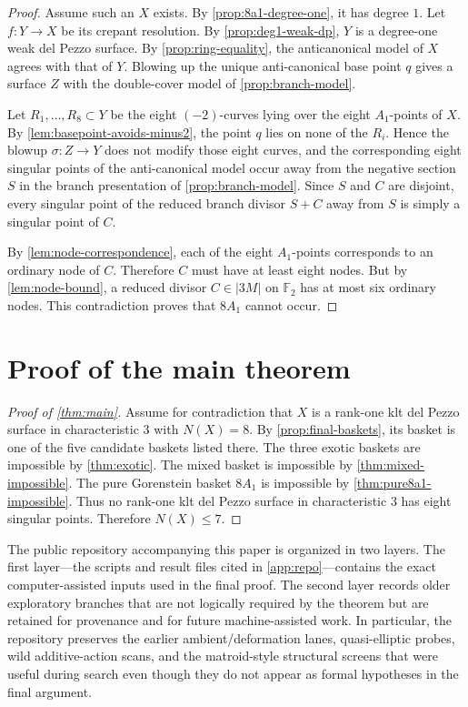 \documentclass[11pt]{article}
\theoremstyle{definition}
\begin{document}
\begin{proof}
Assume such an $X$ exists. By \cref{prop:8a1-degree-one}, it has degree $1$. Let $f\colon Y\to X$ be its crepant resolution. By \cref{prop:deg1-weak-dp}, $Y$ is a degree-one weak del Pezzo surface. By \cref{prop:ring-equality}, the anticanonical model of $X$ agrees with that of $Y$. Blowing up the unique anti-canonical base point $q$ gives a surface $Z$ with the double-cover model of \cref{prop:branch-model}.

Let $R_1,\dots,R_8\subset Y$ be the eight $(-2)$-curves lying over the eight $A_1$-points of $X$. By \cref{lem:basepoint-avoids-minus2}, the point $q$ lies on none of the $R_i$. Hence the blowup $\sigma\colon Z\to Y$ does not modify those eight curves, and the corresponding eight singular points of the anti-canonical model occur away from the negative section $S$ in the branch presentation of \cref{prop:branch-model}. Since $S$ and $C$ are disjoint, every singular point of the reduced branch divisor $S+C$ away from $S$ is simply a singular point of $C$.

By \cref{lem:node-correspondence}, each of the eight $A_1$-points corresponds to an ordinary node of $C$. Therefore $C$ must have at least eight nodes. But by \cref{lem:node-bound}, a reduced divisor $C\in |3M|$ on $\mathbb F_2$ has at most six ordinary nodes. This contradiction proves that $8A_1$ cannot occur.
\end{proof}

\section{Proof of the main theorem}

\begin{proof}[Proof of \cref{thm:main}]
Assume for contradiction that $X$ is a rank-one klt del Pezzo surface in characteristic $3$ with $N(X)=8$. By \cref{prop:final-baskets}, its basket is one of the five candidate baskets listed there. The three exotic baskets are impossible by \cref{thm:exotic}. The mixed basket is impossible by \cref{thm:mixed-impossible}. The pure Gorenstein basket $8A_1$ is impossible by \cref{thm:pure8a1-impossible}. Thus no rank-one klt del Pezzo surface in characteristic $3$ has eight singular points. Therefore $N(X)\le 7$.
\end{proof}

The public repository accompanying this paper is organized in two layers. The first layer---the scripts and result files cited in \cref{app:repo}---contains the exact computer-assisted inputs used in the final proof. The second layer records older exploratory branches that are not logically required by the theorem but are retained for provenance and for future machine-assisted work. In particular, the repository preserves the earlier ambient/deformation lanes, quasi-elliptic probes, wild additive-action scans, and the matroid-style structural screens that were useful during search even though they do not appear as formal hypotheses in the final argument.
\end{document}
